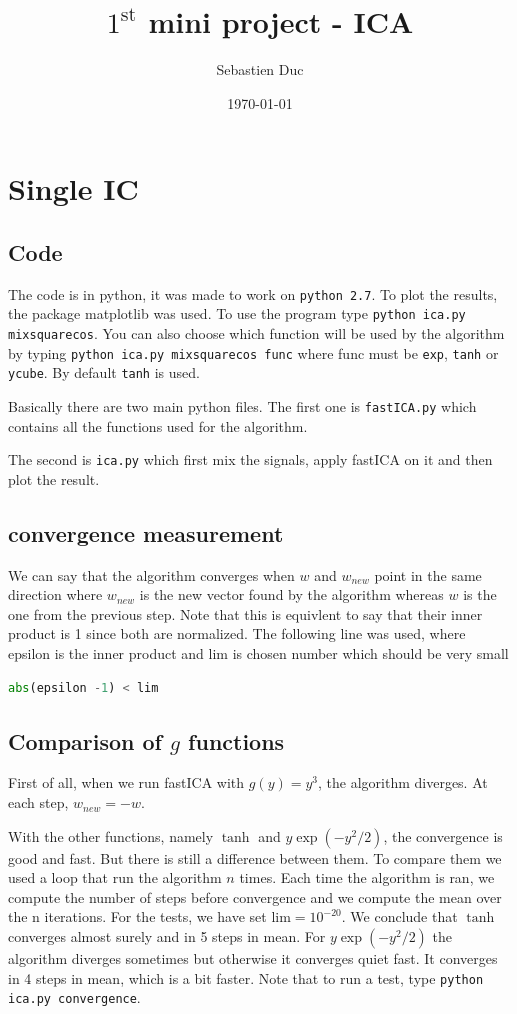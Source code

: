 \documentclass[10pt,a4paper]{article}
\author{Sebastien Duc}
\date{\today}
\title{$1^{\mathrm{st}}$ mini project - ICA}
\begin{document}
\maketitle
{}
\section{Single IC}
\subsection{Code}
The code is in python, it was made to work on \texttt{python 2.7}. To plot the results, the package matplotlib was used. To use the program type \texttt{python ica.py mixsquarecos}.
You can also choose which function will be used by the algorithm by typing \texttt{python ica.py mixsquarecos func} where func must be \texttt{exp}, \texttt{tanh} or \texttt{ycube}. By default \texttt{tanh} is used.

Basically there are two main python files. The first one is \texttt{fastICA.py} which contains all the functions used for the
algorithm.

The second is \texttt{ica.py} which first mix the signals, apply fastICA on it and then plot the result.

\subsection{convergence measurement}
We can say that the algorithm converges when $w$ and $w_{new}$ point in the same direction where $w_{new}$ is the new vector found by the algorithm whereas $w$ is the one from the previous step. Note that this is equivlent to say that their inner product is 1 since both are normalized.
The following line was used, where epsilon is the inner product and lim is chosen number which should be very small
\begin{lstlisting}[language=python]
abs(epsilon -1) < lim
\end{lstlisting}
\subsection{Comparison of $g$ functions}
First of all, when we run fastICA with $g(y) = y^3$, the algorithm diverges. At each step, $w_{new} = -w$.

With the other functions, namely $\tanh$ and $y\exp(-y^2/2)$, the convergence is good and fast. But there is still a difference between them. To compare them we used a loop that run the algorithm $n$ times. Each time the algorithm is ran, we compute the number of steps before convergence and we compute 
the mean over the n iterations. For the tests, we have set $\mathrm{lim} = 10^{-20}$. We conclude that $\tanh$ converges almost surely and in 5 steps in mean. For $y\exp(-y^2/2)$ the algorithm diverges sometimes but otherwise it converges quiet fast. It converges in 4 steps in mean, which is a bit faster. 
Note that to run a test, type \texttt{python ica.py convergence}.
\end{document}
